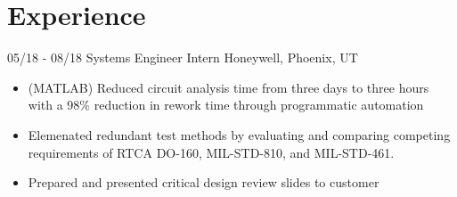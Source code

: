 \documentclass[]{friggeri-cv}
\begin{document}
\section{Experience}
\vspace{-3mm}
\begin{entrylist}
  \entry
    {05/18 - 08/18}
    {Systems Engineer Intern}
    {Honeywell, Phoenix, UT}
    {\vspace{-4mm}
    \begin{itemize}
        \item (MATLAB) Reduced circuit analysis time from three days to three hours with a 98\% reduction in rework time through programmatic automation
        \item Elemenated redundant test methods by evaluating and comparing competing requirements of RTCA DO-160, MIL-STD-810, and MIL-STD-461.
        \item Prepared and presented critical design review slides to customer
    \end{itemize}\vspace{1mm}}


\end{entrylist}
\end{document}
